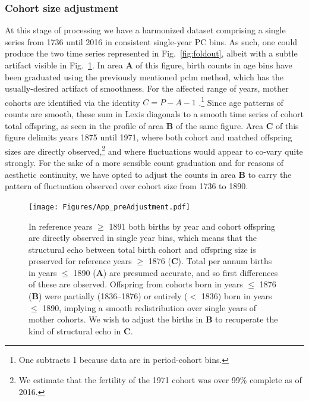 \subsubsection{Cohort size adjustment}
\label{sec:cohadj}
At this stage of processing we have a harmonized dataset comprising a single series from 1736 until 2016 in consistent single-year PC bins. As such, one could produce the two time series represented in Fig.~\ref{fig:foldout}, albeit with a subtle artifact visible in Fig.~\ref{fig:toosmooth}. In area \textbf{A} of this figure, birth counts in age bins have been graduated using the previously mentioned pclm method, which has the usually-desired artifact of smoothness. For the affected range of years, mother cohorts are identified via the identity $C = P - A - 1$ .\footnote{One subtracts 1 because data are in period-cohort bins.} Since age patterns of counts are smooth, these sum in Lexis diagonals to a smooth time series of cohort total offspring, as seen in the profile of area \textbf{B} of the same figure. Area \textbf{C} of this figure delimits years 1875 until 1971, where both cohort and matched offspring sizes are directly observed,\footnote{We estimate that the fertility of the 1971 cohort was over 99\% complete as of 2016.} and where fluctuations would appear to co-vary quite strongly. For the sake of a more sensible count graduation and for reasons of aesthetic continuity, we have opted to adjust the counts in area \textbf{B} to carry the pattern of fluctuation observed over cohort size from 1736 to 1890.

\begin{figure}[ht!]
\centering
\texttt{[image: Figures/App\_preAdjustment.pdf]}
\caption{In reference years $\ge$ 1891 both births by year and cohort offspring are directly observed in single year bins, which means that the structural echo between total birth cohort and offspring size is preserved for reference years $\ge$ 1876  (\textbf{C}). Total per annum births in years $\le$ 1890 (\textbf{A}) are presumed accurate, and so first differences of these are observed. Offspring from cohorts born in years $\le$ 1876 (\textbf{B}) were partially (1836--1876) or entirely ($<$ 1836) born in years $\le$ 1890, implying a smooth redistribution over single years of mother cohorts. We wish to adjust the births in \textbf{B} to recuperate the kind of structural echo in \textbf{C}.}
\label{fig:toosmooth}
\end{figure}

